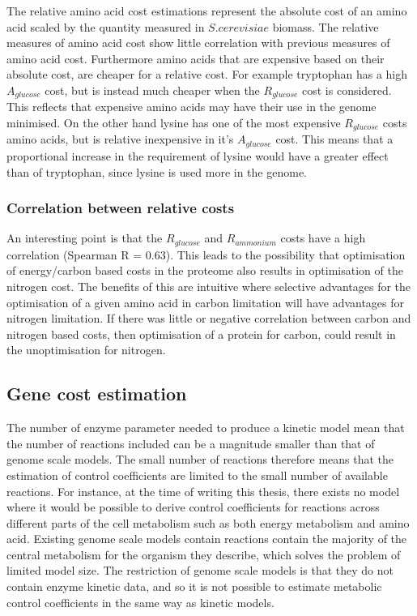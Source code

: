 The relative amino acid cost estimations represent the absolute cost of an amino acid scaled by the quantity measured in $S. cerevisiae$ biomass. The relative measures of amino acid cost show little correlation with previous measures of amino acid cost. Furthermore amino acids that are expensive based on their absolute cost, are cheaper for a relative cost. For example tryptophan has a high $A_{glucose}$ cost, but is instead much cheaper when the $R_{glucose}$ cost is considered. This reflects that expensive amino acids may have their use in the genome minimised. On the other hand lysine has one of the most expensive $R_{glucose}$ costs amino acids, but is relative inexpensive in it's $A_{glucose}$ cost. This means that a proportional increase in the requirement of lysine would have a greater effect than of tryptophan, since lysine is used more in the genome.

\subsubsection{Correlation between relative costs}

An interesting point is that the $R_{glucose}$ and $R_{ammonium}$ costs have a high correlation (Spearman R = 0.63). This leads to the possibility that optimisation of energy/carbon based costs in the proteome also results in optimisation of the nitrogen cost. The benefits of this are intuitive where selective advantages for the optimisation of a given amino acid in carbon limitation will have advantages for nitrogen limitation. If there was little or negative correlation between carbon and nitrogen based costs, then optimisation of a protein for carbon, could result in the unoptimisation for nitrogen.

\subsection{Gene cost estimation}

The number of enzyme parameter needed to produce a kinetic model mean that the number of reactions included can be a magnitude smaller than that of genome scale models. The small number of reactions therefore means that the estimation of  control coefficients are limited to the small number of available reactions. For instance, at the time of writing this thesis, there exists no model where it would be possible to derive control coefficients for reactions across different parts of the cell metabolism such as both energy metabolism and amino acid. Existing genome scale models contain reactions contain the majority of the central metabolism for the organism they describe, which solves the problem of limited model size. The restriction of genome scale models is that they do not contain enzyme kinetic data, and so it is not possible to estimate metabolic control coefficients in the same way as kinetic models.

